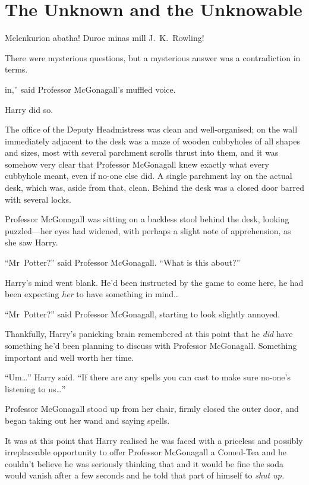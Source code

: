 \chapter{The Unknown and the Unknowable}

\begin{chapterOpeningAuthorNote}
Melenkurion abatha! Duroc minas mill J.~K.~Rowling!
\end{chapterOpeningAuthorNote}
\begin{chapterOpeningQuote}
There were mysterious questions, but a mysterious answer was a contradiction in terms.
\end{chapterOpeningQuote}

 in,” said Professor McGonagall’s muffled voice.

\hplettrineextrapara
Harry did so.

The office of the Deputy Headmistress was clean and well-organised; on the wall immediately adjacent to the desk was a maze of wooden cubbyholes of all shapes and sizes, most with several parchment scrolls thrust into them, and it was somehow very clear that Professor McGonagall knew exactly what every cubbyhole meant, even if no-one else did. A single parchment lay on the actual desk, which was, aside from that, clean. Behind the desk was a closed door barred with several locks.

Professor McGonagall was sitting on a backless stool behind the desk, looking puzzled—her eyes had widened, with perhaps a slight note of apprehension, as she saw Harry.

“Mr~Potter?” said Professor McGonagall. “What is this about?”

Harry’s mind went blank. He’d been instructed by the game to come here, he had been expecting \emph{her} to have something in mind…

“Mr~Potter?” said Professor McGonagall, starting to look slightly annoyed.

Thankfully, Harry’s panicking brain remembered at this point that he \emph{did} have something he’d been planning to discuss with Professor McGonagall. Something important and well worth her time.

“Um…” Harry said. “If there are any spells you can cast to make sure no-one’s listening to us…”

Professor McGonagall stood up from her chair, firmly closed the outer door, and began taking out her wand and saying spells.

It was at this point that Harry realised he was faced with a priceless and possibly irreplaceable opportunity to offer Professor McGonagall a Comed-Tea and he couldn’t believe he was seriously thinking that and it would be fine the soda would vanish after a few seconds and he told that part of himself to \emph{shut up.}

